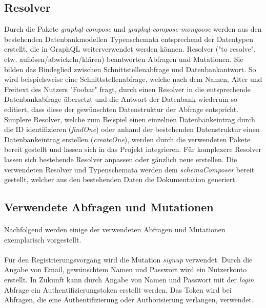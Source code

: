 \subsection{Resolver}
Durch die Pakete \textit{graphql-compose} und \textit{graphql-compose-mongoose} werden aus den bestehenden Datenbankmodellen Typenschemata entsprechend der Datentypen erstellt, die in GraphQL weiterverwendet werden können. 
Resolver ("to resolve", etw. auflösen/abwickeln/klären) beantworten Abfragen und Mutationen.
Sie bilden das Bindeglied zwischen Schnittstellenabfrage und Datenbankantwort.
So wird beispielsweise eine Schnittstellenabfrage, welche nach dem Namen, Alter und Freitext des Nutzers "Foobar" fragt, durch einen Resolver in die entsprechende Datenbankabfrage übersetzt und die Antwort der Datenbank wiederum so editiert, dass diese der gewünschten Datenstruktur der Abfrage entspricht. %
Simplere Resolver, welche zum Beispiel einen einzelnen Datenbankeintrag durch die ID identifizieren (\textit{findOne}) oder anhand der bestehenden Datenstruktur einen Datenbankeintrag erstellen (\textit{createOne}), werden durch die verwendeten Pakete bereit gestellt und lassen sich in das Projekt integrieren.
Für komplexere Resolver lassen sich bestehende Resolver anpassen oder gänzlich neue erstellen.
Die verwendeten Resolver und Typenschemata werden dem \textit{schemaComposer} bereit gestellt, welcher aus den bestehenden Daten die Dokumentation generiert.


\subsection{Verwendete Abfragen und Mutationen}
\paragraph{}
Nachfolgend werden einige der verwendeten Abfragen und Mutationen exemplarisch vorgestellt.

\paragraph{}
Für den Registrierungsvorgang wird die Mutation \textit{signup} verwendet.
Durch die Angabe von Email, gewünschtem Namen und Passwort wird ein Nutzerkonto erstellt.
In Zukunft kann durch Angabe von Namen und Passwort mit der \textit{login} Abfrage ein Authentifizierungstoken erstellt werden. Das Token wird bei Abfragen, die eine Authentifizierung oder Authorisierung verlangen, verwendet.

